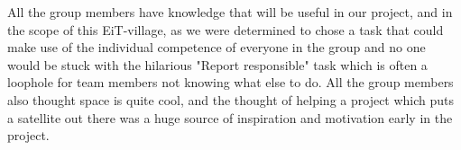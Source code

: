All the group members have knowledge that will be useful in our project, and in the scope of this EiT-village, as we were determined to chose a task that could make use of the individual competence of everyone in the group and no one would be stuck with the hilarious "Report responsible" task which is often a loophole for team members not knowing what else to do. All the group members also thought space is quite cool, and the thought of helping a project which puts a satellite out there was a huge source of inspiration and motivation early in the project.








